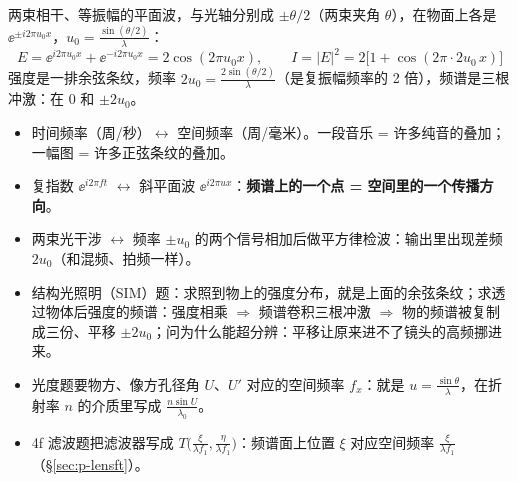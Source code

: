 \begin{center}
\end{center}
两束相干、等振幅的平面波，与光轴分别成 $\pm\theta/2$（两束夹角 $\theta$），在物面上各是 $\ee^{\pm i2\pi u_0x}$，$u_0=\frac{\sin(\theta/2)}{\lambda}$：
\[
E=\ee^{i2\pi u_0x}+\ee^{-i2\pi u_0x}=2\cos(2\pi u_0x),\qquad I=|E|^2=2\big[1+\cos(2\pi\cdot2u_0\,x)\big]
\]
强度是一排余弦条纹，频率 $2u_0=\frac{2\sin(\theta/2)}{\lambda}$（是复振幅频率的 2 倍），频谱是三根冲激：在 $0$ 和 $\pm2u_0$。

\begin{idea}[类比]
\begin{itemize}
\item 时间频率（周/秒）$\leftrightarrow$ 空间频率（周/毫米）。一段音乐 = 许多纯音的叠加；一幅图 = 许多正弦条纹的叠加。
\item 复指数 $\ee^{i2\pi ft}$ $\leftrightarrow$ 斜平面波 $\ee^{i2\pi ux}$：\textbf{频谱上的一个点 = 空间里的一个传播方向}。
\item 两束光干涉 $\leftrightarrow$ 频率 $\pm u_0$ 的两个信号相加后做平方律检波：输出里出现差频 $2u_0$（和混频、拍频一样）。
\end{itemize}
\end{idea}

\pkao
\begin{itemize}
\item 结构光照明（SIM）题：求照到物上的强度分布，就是上面的余弦条纹；求透过物体后强度的频谱：强度相乘 $\Rightarrow$ 频谱卷积三根冲激 $\Rightarrow$ 物的频谱被复制成三份、平移 $\pm2u_0$；问为什么能超分辨：平移让原来进不了镜头的高频挪进来。
\item 光度题要物方、像方孔径角 $U$、$U'$ 对应的空间频率 $f_x$：就是 $u=\frac{\sin\theta}{\lambda}$，在折射率 $n$ 的介质里写成 $\frac{n\sin U}{\lambda_0}$。
\item 4f 滤波题把滤波器写成 $T\big(\frac{\xi}{\lambda f_1},\frac{\eta}{\lambda f_1}\big)$：频谱面上位置 $\xi$ 对应空间频率 $\frac{\xi}{\lambda f_1}$（§\ref{sec:p-lensft}）。
\end{itemize}

